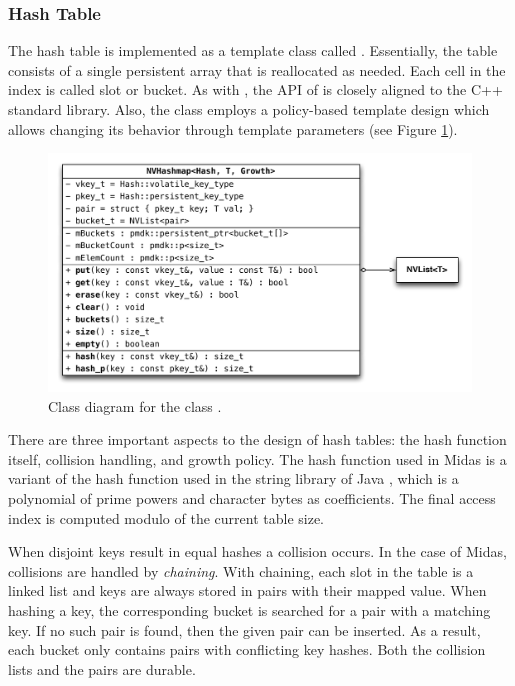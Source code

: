 \subsubsection{Hash Table}

The hash table is implemented as a template class called .
Essentially, the table consists of a single persistent array that is reallocated
as needed. Each cell in the index is called slot or bucket. As with
, the API of  is closely aligned to the C++
standard library. Also, the class employs a policy-based template design which
allows changing its behavior through template parameters (see Figure \ref{fig:impl-map}).

\begin{figure}[h!]
    \centering
    \includegraphics[scale=0.66]{figures/impl/map.pdf}
    \caption{Class diagram for the class .}
    \label{fig:impl-map}
\end{figure}

There are three important aspects to the design of hash tables: the hash
function itself, collision handling, and growth policy. The hash function used
in Midas is a variant of the hash function used in the string library of Java
\cite{javadoc2018hashcode}, which is a polynomial of prime powers and character
bytes as coefficients. The final access index is computed modulo of the current
table size.

When disjoint keys result in equal hashes a collision occurs. In the case of
Midas, collisions are handled by \emph{chaining}. With chaining, each slot in
the table is a linked list and keys are always stored in pairs with their mapped
value. When hashing a key, the corresponding bucket is searched for a pair with
a matching key. If no such pair is found, then the given pair can be inserted.
As a result, each bucket only contains pairs with conflicting key hashes. Both
the collision lists and the pairs are durable.

